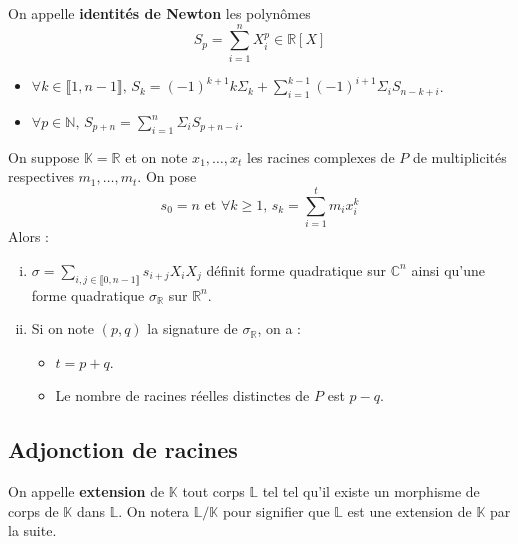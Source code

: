 
	\begin{definition}
		On appelle \textbf{identités de Newton} les polynômes
		\[ S_p = \sum_{i=1}^n X_i^p \in \mathbb{R}[X] \]
	\end{definition}

	\begin{proposition}
		\begin{itemize}
			\item $\forall k \in \llbracket 1, n-1 \rrbracket, \, S_k = (-1)^{k+1} k \Sigma_k + \sum_{i=1}^{k-1} (-1)^{i+1} \Sigma_i S_{n-k+i}$.
			\item $\forall p \in \mathbb{N}, \, S_{p+n} = \sum_{i=1}^n \Sigma_i S_{p+n-i}$.
		\end{itemize}
	\end{proposition}


	\begin{application}
		On suppose $\mathbb{K} = \mathbb{R}$ et on note $x_1, \dots, x_t$ les racines complexes de $P$ de multiplicités respectives $m_1, \dots, m_t$. On pose
		\[ s_0 = n \text{ et } \forall k \geq 1, \, s_k = \sum_{i=1}^t m_i x_i^k \]
		Alors :
		\begin{enumerate}[(i)]
			\item $\sigma = \sum_{i, j \in \llbracket 0, n-1 \rrbracket} s_{i+j} X_i X_j$ définit forme quadratique sur $\mathbb{C}^n$ ainsi qu'une forme quadratique $\sigma_{\mathbb{R}}$ sur $\mathbb{R}^n$.
			\item Si on note $(p,q)$ la signature de $\sigma_{\mathbb{R}}$, on a :
			\begin{itemize}
				\item $t = p + q$.
				\item Le nombre de racines réelles distinctes de $P$ est $p-q$.
			\end{itemize}
		\end{enumerate}
	\end{application}

	\subsection{Adjonction de racines}
	\label{144-1}


	\begin{definition}
		On appelle \textbf{extension} de $\mathbb{K}$ tout corps $\mathbb{L}$ tel tel qu'il existe un morphisme de corps de $\mathbb{K}$ dans $\mathbb{L}$. On notera $\mathbb{L} / \mathbb{K}$ pour signifier que $\mathbb{L}$ est une extension de $\mathbb{K}$ par la suite.
	\end{definition}

